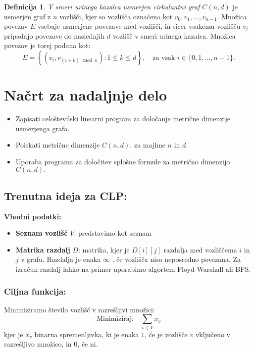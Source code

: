 \documentclass[a4paper,12pt]{article}
\theoremstyle{definition}
\newtheorem{definicija}{Definicija}[section]
\theoremstyle{remark}
\theoremstyle{definition}
\begin{document}
\begin{definicija}
    \textit{V smeri urinega kazalca usmerjen cirkulantni graf \( C(n, d) \) }je usmerjen graf z \( n \) vozlišči, kjer so vozlišča označena kot 
    \( v_0, v_1, \dots, v_{n-1} \). Množica povezav \( E \) vsebuje usmerjene povezave med vozlišči, in sicer vsakemu vozlišču \( v_i \) pripadajo povezave do naslednjih \( d \) vozlišč v smeri urinega kazalca. 
    Množica povezav je torej podana kot:
    \[
    E = \left\{ (v_i, v_{(i+k) \mod n}) : 1 \leq k \leq d \right\}, \quad \text{za vsak } i \in \{0, 1, \dots, n-1\}.
    \]
\end{definicija}

\section{Načrt za nadaljnje delo}

\begin{itemize}
    \item Zapisati celoštevilski linearni program za določanje metrične dimenzije usmerjenga grafa. 
    \item Poiskati metrične dimenzije $C(n, d).$ za majhne $n$ in $d$.
    \item Uporaba programa za določitev splošne formule za metrično dimenzijo $C(n, d).$
\end{itemize}



\subsection*{Trenutna ideja za CLP:}

\noindent
\textbf{Vhodni podatki:}
\begin{itemize}
    \item \textbf{Seznam vozlišč} \( V \): predstavimo kot seznam 
    \item \textbf{Matrika razdalj} \( D \): matrika, kjer je \( D[i][j] \) razdalja med vozliščema \( i \) in \( j \) v grafu. Razdalja je enaka  $\infty$ , če vozlišča niso neposredno povezana.
    Za izračun razdalj lahko na primer uporabimo algortem Floyd-Warshall ali BFS.
\end{itemize}

\subsubsection*{Ciljna funkcija:}
Minimiziramo število vozlišč v razrešljivi množici:
\begin{equation*}
\text{Minimiziraj:} \quad \sum_{v \in V} x_v
\end{equation*}
kjer je $x_v$ binarna spremenljivka, ki je enaka $1$, če je vozlišče $v$ vključeno v razrešljivo množico, in $0$, če ni.
\end{document}
